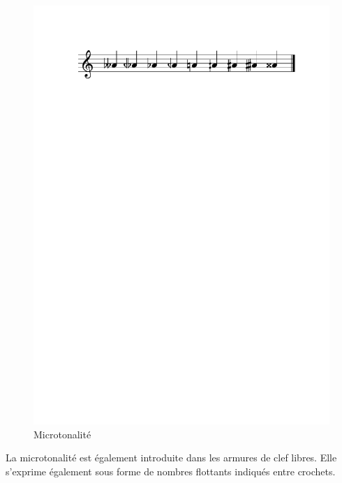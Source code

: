 \documentclass{article}
\begin{document}
\begin{figure}[h]
\centering
\includegraphics[width=\columnwidth]{img/partitions/alter.pdf}
\caption{Microtonalité}
\label{fig:alter}
\end{figure}

La microtonalité est également introduite dans les armures de clef libres. Elle s'exprime également sous forme de nombres flottants indiqués entre crochets.
\end{document}
